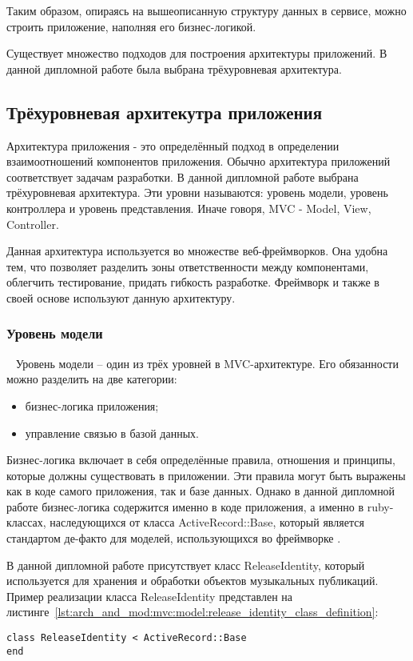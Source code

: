 Таким образом, опираясь на вышеописанную структуру данных в сервисе, можно строить приложение, наполняя его бизнес-логикой.

Существует множество подходов для построения архитектуры приложений. В данной дипломной работе была выбрана трёхуровневая архитектура.

\subsection{Трёхуровневая архитекутра приложения}
\label{sub:arch_and_mod:mvc}

Архитектура приложения - это определённый подход в определении взаимоотношений компонентов приложения. Обычно архитектура приложений соответствует задачам разработки. В данной дипломной работе выбрана трёхуровневая архитектура. Эти уровни называются: уровень модели, уровень контроллера и уровень представления. Иначе говоря, MVC - Model, View, Controller.

Данная архитектура используется во множестве веб-фреймворков. Она удобна тем, что позволяет разделить зоны ответственности между компонентами, облегчить тестирование, придать гибкость разработке. Фреймворк \ror{} и \ajs{} также в своей основе используют данную архитектуру.

\subsubsection{Уровень модели}
\label{sub:arch_and_mod:mvc:model}
~\newline
\indent Уровень модели -- один из трёх уровней в MVC-архитектуре. Его обязанности можно разделить на две категории:

\begin{itemize}
  \item бизнес-логика приложения;
  \item управление связью в базой данных.
\end{itemize}

Бизнес-логика включает в себя определённые правила, отношения и принципы, которые должны существовать в приложении. Эти правила могут быть выражены как в коде самого приложения, так и базе данных. Однако в данной дипломной работе бизнес-логика содержится именно в коде приложения, а именно в ruby-классах, наследующихся от класса ActiveRecord::Base, который является стандартом де-факто для моделей, использующихся во фреймворке \ror{}.

В данной дипломной работе присутствует класс ReleaseIdentity, который используется для хранения и обработки объектов музыкальных публикаций. Пример реализации класса ReleaseIdentity представлен на листинге~\ref{lst:arch_and_mod:mvc:model:release_identity_class_definition}:
\begin{lstlisting}[style=fsharpstyle,caption={Базовая реализация класса ReleaseIdentity}, label=lst:arch_and_mod:mvc:model:release_identity_class_definition]
class ReleaseIdentity < ActiveRecord::Base
end
\end{lstlisting}


